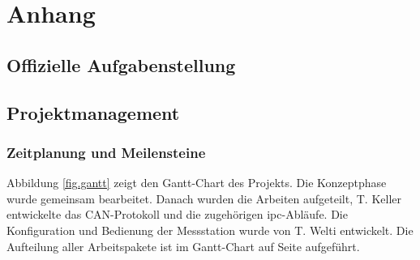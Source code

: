 %
%



\appendix
\chapter{Anhang}\label{chap.anhang}


\section{Offizielle Aufgabenstellung}\label{app.aufgabenstellung}



\section{Projektmanagement}\label{app.projektmanagement}

\subsection{Zeitplanung und Meilensteine}
Abbildung \ref{fig.gantt} zeigt den Gantt-Chart des Projekts. Die Konzeptphase wurde gemeinsam bearbeitet. Danach wurden die Arbeiten aufgeteilt, T. Keller entwickelte das CAN-Protokoll und die zugehörigen \gls{ipc}-Abläufe. Die Konfiguration und Bedienung der Messstation wurde von T. Welti entwickelt. Die Aufteilung aller Arbeitspakete ist im Gantt-Chart auf Seite \pageref{fig.gantt} aufgeführt.

